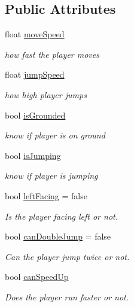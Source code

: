 \subsection*{Public Attributes}
\begin{DoxyCompactItemize}
\item 
float \hyperlink{class_player_movement_a93207dc2742fe0f0b651a54d610b14aa}{move\+Speed}
\begin{DoxyCompactList}\small\item\em how fast the player moves \end{DoxyCompactList}\item 
float \hyperlink{class_player_movement_a0b04326b12b370063895e93d1a20655d}{jump\+Speed}
\begin{DoxyCompactList}\small\item\em how high player jumps \end{DoxyCompactList}\item 
bool \hyperlink{class_player_movement_a27276d8e80bcd5acbb70354b06d66841}{is\+Grounded}
\begin{DoxyCompactList}\small\item\em know if player is on ground \end{DoxyCompactList}\item 
bool \hyperlink{class_player_movement_a1a59782fc52356398194e29255f1a0ae}{is\+Jumping}
\begin{DoxyCompactList}\small\item\em know if player is jumping \end{DoxyCompactList}\item 
bool \hyperlink{class_player_movement_a9be62b9ccfa0da0b71b5247df817fe4b}{left\+Facing} = false
\begin{DoxyCompactList}\small\item\em Is the player facing left or not. \end{DoxyCompactList}\item 
bool \hyperlink{class_player_movement_a93c85b6422113049146e1d40b215a8e2}{can\+Double\+Jump} = false
\begin{DoxyCompactList}\small\item\em Can the player jump twice or not. \end{DoxyCompactList}\item 
bool \hyperlink{class_player_movement_acddd245968579989670e4c0953ae2746}{can\+Speed\+Up}
\begin{DoxyCompactList}\small\item\em Does the player run faster or not. \end{DoxyCompactList}\item 

\end{DoxyCompactItemize}
